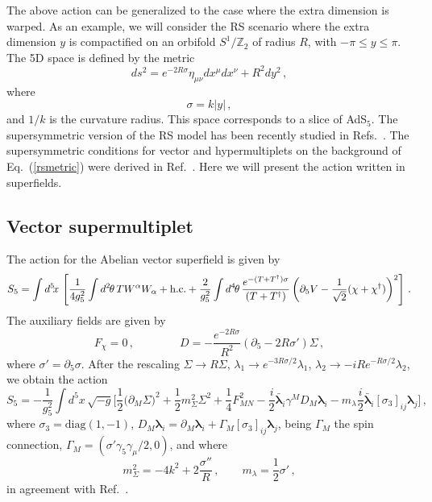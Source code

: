 \documentclass[a4paper,12pt]{article}
\newcommand{\Zparity}{\ensuremath{\mathbb{Z}_2}}
\newcommand{\BLambda}{\boldsymbol{\lambda}}
\begin{document}
The above action can be generalized to the case where the extra
dimension is warped. As an example, we will consider the 
RS scenario \cite{rs} where the extra dimension 
$y$ is compactified on an orbifold $S^1/\Zparity$ of radius $R$, with 
$-\pi \leq y \leq \pi $.
The 5D space is defined by the metric
\begin{equation}
ds^2=e^{-2R\sigma}\eta_{\mu\nu}dx^\mu dx^\nu+R^2dy^2\, ,
\label{rsmetric}
\end{equation}
where
\begin{equation}
\sigma=k|y|\, ,
\end{equation}
and $1/k$ is the curvature radius.  This space corresponds to a slice of
AdS$_5$.  The supersymmetric version of the RS model
has been recently studied in Refs.~\cite{gp,rssusy}.
The supersymmetric conditions for vector and hypermultiplets 
on the background of Eq.~(\ref{rsmetric})
were derived
in Ref.~\cite{gp}.  
Here we will present the action written in
superfields.  


\subsection{Vector supermultiplet}

The action for the Abelian vector superfield is given by
\begin{equation}
   S_5 = \int d^{5}\! x\, \left[ \frac{1}{4g^2_5} \int 
d^2\mspace{-2mu}\theta\, T
        W^{\alpha}W_{\alpha} + \text{h.c.} + \frac{2}{g^2_5} \int
        d^4\mspace{-2mu}\theta\,
 \frac{e^{-(T + T^{\dag})\sigma}}{(T +
          T^{\dag})} \left( \partial_5 V - \frac{1}{\sqrt{2}} (\chi +
            \chi^{\dag})\right)^2 \right]\, .
\label{gaugew}
\end{equation}
The  auxiliary fields are  given by
\begin{equation} 
F_\chi=0\, , \qquad\qquad D= - \frac{e^{-2R\sigma}}{R^2} \left(\partial_{5} - 
     2R\sigma' \right) \Sigma\, ,
\end{equation}
where $\sigma'=\partial_5\sigma$.
After the rescaling $\Sigma \rightarrow R \Sigma$, $\lambda_1
 \rightarrow e^{-3R\sigma/2} \lambda_1$, $\lambda_2 \rightarrow - i R
 e^{-R\sigma/2} \lambda_2$, we obtain the action
\begin{equation}
    S_5 = - \frac{1}{g^2_5} \int d^{5}\! x\, \sqrt{-g} \Biggl[ \frac{1}{2}
    \bigl(\partial_{M}\Sigma \bigr)^2 + \frac{1}{2} m^{2}_{\Sigma} \Sigma^{2} +
    \frac{1}{4} F_{MN}^2 - \frac{i}{2} \bar{\BLambda}_{i}
    \gamma^{M} D_{M} {\BLambda}_{i} -
m_{\lambda}\frac{i}{2}\bar{\BLambda}_{i} [\sigma_{3}]_{ij}
    {\BLambda}_{j} \Biggr]\, ,
\end{equation}
where $\sigma_3=\text{diag}(1,-1)$, $D_M {\BLambda}_{i} = \partial_M
{\BLambda}_{i} + \Gamma_M [\sigma_{3}]_{ij} {\BLambda}_{j}$, being $\Gamma_M$
the spin connection, $\Gamma_M =( \sigma' \gamma_{5}\gamma_{\mu} /2,0)$,
and where 
\begin{equation}
    m^2_{\Sigma} = -4 k^2 + 2\frac{\sigma''}{R}\, ,\qquad
    m_{\lambda} = \frac{1}{2}\sigma'\, ,
\end{equation}
in agreement with Ref.~\cite{gp}.
\end{document}
